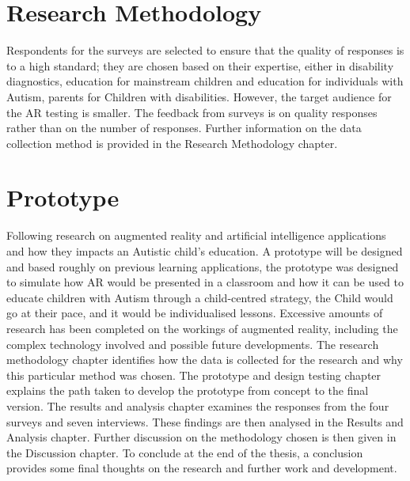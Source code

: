 \section{Research Methodology}

Respondents for the surveys are selected to ensure that the quality of responses is to a high standard; they are chosen based on their expertise, either in disability diagnostics, education for mainstream children and education for individuals with Autism, parents for Children with disabilities. However, the target audience for the AR testing is smaller. The feedback from surveys is on quality responses rather than on the number of responses. Further information on the data collection method is provided in the Research Methodology chapter.

\section{Prototype}

Following research on augmented reality and artificial intelligence applications and how they impacts an Autistic child's education. A prototype will be designed and based roughly on previous learning applications, the prototype was designed to simulate how AR would be presented in a classroom and how it can be used to educate children with Autism through a child-centred strategy, the Child would go at their pace, and it would be individualised lessons. Excessive amounts of research has been completed on the workings of augmented reality, including the complex technology involved and possible future developments. The research methodology chapter identifies how the data is collected for the research and why this particular method was chosen. The prototype and design testing chapter explains the path taken to develop the prototype from concept to the final version. The results and analysis chapter examines the responses from the four surveys and seven interviews. These findings are then analysed in the Results and Analysis chapter. Further discussion on the methodology chosen is then given in the Discussion chapter. To conclude at the end of the thesis, a conclusion provides some final thoughts on the research and further work and development. 


